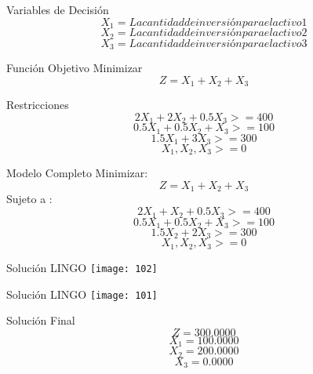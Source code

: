 \documentclass{beamer}
\begin{document}
\begin{frame}[fragile]{Variables de Decisión}
\[X_{1} = La cantidad de inversión para el activo 1\]
\[X_{2} = La cantidad de inversión para el activo 2\]
\[X_{3} = La cantidad de inversión para el activo 3\]

\end{frame}

\begin{frame}[fragile]{Función Objetivo}
Minimizar\\
\[Z = X_{1} + X_{2} + X_{3}\]
\end{frame}

\begin{frame}[fragile]{Restricciones}
\[2X_{1} + 2X_{2} +0.5X_{3}  >= 400\]
\[0.5X_{1} + 0.5X_{2} +X_{3} >= 100\]
\[1.5 X_{1} + 3X_{3} >= 300\]
\[X_{1}, X_{2}, X_{3} >= 0\]

\end{frame}

\begin{frame}[fragile]{Modelo Completo}
Minimizar:
\[Z = X_{1} + X_{2} + X_{3}\]
Sujeto a :\\
\[2X_{1} + X_{2} +0.5X_{3}  >= 400\]
\[0.5X_{1} + 0.5X_{2} +X_{3} >= 100\]
\[1.5 X_{2} + 2X_{3} >= 300\]
\[X_{1}, X_{2}, X_{3} >= 0\]

\end{frame}

\begin{frame}[fragile]{Solución LINGO}
    \texttt{[image: 102]}
\end{frame}
\begin{frame}[fragile]{Solución LINGO}
    \texttt{[image: 101]}
\end{frame}

\begin{frame}[fragile]{Solución Final}
\[Z = 300.0000\]
\[X_{1} = 100.0000\]
\[X_{2} = 200.0000\]
\[X_{3} = 0.0000\]
\end{frame}
\end{document}
